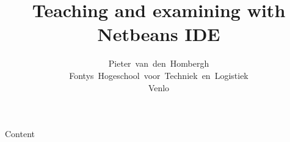 \documentclass{beamer}
\author[HOM]{Pieter~van~den~Hombergh\\Fontys~Hogeschool~voor~Techniek~en~Logistiek\\Venlo}
\title{Teaching and \textbf{examining} with Netbeans IDE}
\begin{document}
\frame{\titlepage}
\begin{frame}{Content}
  \tableofcontents
\end{frame}

\end{document}
